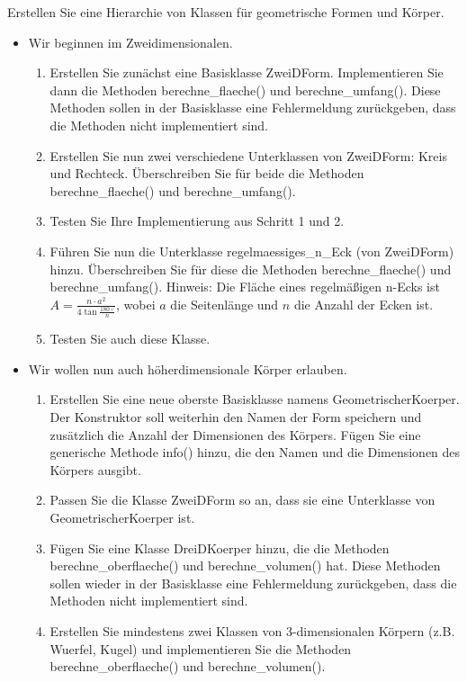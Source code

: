 \begin{myexercise} 
    Erstellen Sie eine Hierarchie von Klassen für geometrische Formen und Körper.
    \begin{itemize}
    \item [a)] Wir beginnen im Zweidimensionalen.
    \begin{enumerate}
        \item Erstellen Sie zunächst eine Basisklasse ZweiDForm. Implementieren Sie dann die Methoden berechne\_flaeche() und berechne\_umfang(). Diese Methoden sollen in der Basisklasse eine Fehlermeldung zurückgeben, dass die Methoden nicht implementiert sind.
        \item Erstellen Sie nun zwei verschiedene Unterklassen von ZweiDForm: Kreis und Rechteck. Überschreiben Sie für beide die Methoden berechne\_flaeche() und berechne\_umfang().
        \item Testen Sie Ihre Implementierung aus Schritt 1 und 2.
        \item Führen Sie nun die Unterklasse regelmaessiges\_n\_Eck (von ZweiDForm) hinzu. Überschreiben Sie für diese die Methoden berechne\_flaeche() und berechne\_umfang(). Hinweis: Die Fläche eines regelmäßigen n-Ecks ist $A=\frac{n\cdot a^2}{4\tan{\frac{180\circ}{n}}}$, wobei $a$ die Seitenlänge und $n$ die Anzahl der Ecken ist.
        \item Testen Sie auch diese Klasse.
    \end{enumerate}

    \item [b)] Wir wollen nun auch höherdimensionale Körper erlauben.
    \begin{enumerate}
        \item Erstellen Sie eine neue oberste Basisklasse namens GeometrischerKoerper. Der Konstruktor soll weiterhin den Namen der Form speichern und zusätzlich die Anzahl der Dimensionen des Körpers. Fügen Sie eine generische Methode info() hinzu, die den Namen und die Dimensionen des Körpers ausgibt.
        \item Passen Sie die Klasse ZweiDForm so an, dass sie eine Unterklasse von GeometrischerKoerper ist.
        \item Fügen Sie eine Klasse DreiDKoerper hinzu, die die Methoden berechne\_oberflaeche() und berechne\_volumen() hat. Diese Methoden sollen wieder in der Basisklasse eine Fehlermeldung zurückgeben, dass die Methoden nicht implementiert sind.
        \item Erstellen Sie mindestens zwei Klassen von 3-dimensionalen Körpern (z.B. Wuerfel, Kugel) und implementieren Sie die Methoden berechne\_oberflaeche() und berechne\_volumen().
    \end{enumerate}


\end{itemize}
\end{myexercise}

